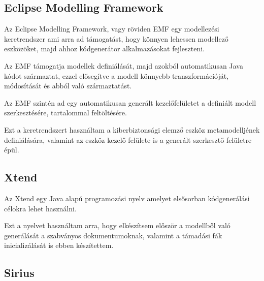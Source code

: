 \subsection{Eclipse Modelling Framework}

Az Eclipse Modelling Framework, vagy röviden EMF egy modellezési keretrendszer ami arra ad támogatást, hogy könnyen lehessen modellező eszközöket, majd ahhoz kódgenerátor alkalmazásokat fejleszteni.

Az EMF támogatja modellek definiálását, majd azokból automatikusan Java kódot származtat, ezzel elősegítve a modell könnyebb transzformációját, módosítását és abból való származtatást.

Az EMF szintén ad egy automatikusan generált kezelőfelületet a definiált modell szerkesztésére, tartalommal feltöltésére.

Ezt a keretrendszert használtam a kiberbiztonsági elemző eszköz metamodelljének definiálására, valamint az eszköz kezelő felülete is a generált szerkesztő felületre épül.



\subsection{Xtend}

Az Xtend egy Java alapú programozási nyelv amelyet elsősorban kódgenerálási célokra lehet használni.

Ezt a nyelvet használtam arra, hogy elkészítsem először a modellből való generálását a szabványos dokumentumoknak, valamint a támadási fák inicializálását is ebben készítettem.



\subsection{Sirius}
